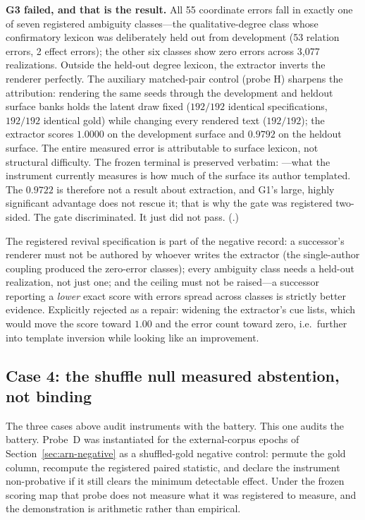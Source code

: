 \textbf{G3 failed, and that is the result.} All 55 coordinate errors fall in exactly one of seven registered ambiguity classes---the qualitative-degree class whose confirmatory lexicon was deliberately held out from development (53 relation errors, 2 effect errors); the other six classes show zero errors across 3{,}077 realizations. Outside the held-out degree lexicon, the extractor inverts the renderer perfectly. The auxiliary matched-pair control (probe H) sharpens the attribution: rendering the same seeds through the development and heldout surface banks holds the latent draw fixed ($192/192$ identical specifications, $192/192$ identical gold) while changing every rendered text ($192/192$); the extractor scores $1.0000$ on the development surface and $0.9792$ on the heldout surface. The entire measured error is attributable to surface lexicon, not structural difficulty. The frozen terminal is preserved verbatim: ---what the instrument currently measures is how much of the surface its author templated. The $0.9722$ is therefore not a result about extraction, and G1's large, highly significant advantage does not rescue it; that is why the gate was registered two-sided. The gate discriminated. It just did not pass. (.)

The registered revival specification is part of the negative record: a successor's renderer must not be authored by whoever writes the extractor (the single-author coupling produced the zero-error classes); every ambiguity class needs a held-out realization, not just one; and the ceiling must not be raised---a successor reporting a \emph{lower} exact score with errors spread across classes is strictly better evidence. Explicitly rejected as a repair: widening the extractor's cue lists, which would move the score toward $1.00$ and the error count toward zero, i.e.\ further into template inversion while looking like an improvement.

\subsection{Case 4: the shuffle null measured abstention, not binding}
\label{sec:battery-refuted}

The three cases above audit instruments with the battery. This one audits the battery. Probe~D was instantiated for the external-corpus epochs of Section~\ref{sec:arn-negative} as a shuffled-gold negative control: permute the gold column, recompute the registered paired statistic, and declare the instrument non-probative if it still clears the minimum detectable effect. Under the frozen scoring map that probe does not measure what it was registered to measure, and the demonstration is arithmetic rather than empirical.

